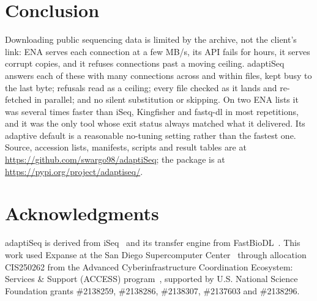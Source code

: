 \documentclass[conference]{IEEEtran}
\begin{document}
\section{Conclusion}
Downloading public sequencing data is limited by the archive, not the client's link: ENA serves each connection at a few MB/s, its API fails for hours, it serves corrupt copies, and it refuses connections past a moving ceiling. adaptiSeq answers each of these with many connections across and within files, kept busy to the last byte; refusals read as a ceiling; every file checked as it lands and re-fetched in parallel; and no silent substitution or skipping. On two ENA lists it was several times faster than iSeq, Kingfisher and fastq-dl in most repetitions, and it was the only tool whose exit status always matched what it delivered. Its adaptive default is a reasonable no-tuning setting rather than the fastest one. Source, accession lists, manifests, scripts and result tables are at \url{https://github.com/swargo98/adaptiSeq}; the package is at \url{https://pypi.org/project/adaptiseq/}.

\section*{Acknowledgments}
adaptiSeq is derived from iSeq~\cite{iseq} and its transfer engine from FastBioDL~\cite{fastbiodl}. This work used Expanse at the San Diego Supercomputer Center~\cite{expanse} through allocation CIS250262 from the Advanced Cyberinfrastructure Coordination Ecosystem: Services \& Support (ACCESS) program~\cite{access}, supported by U.S. National Science Foundation grants \#2138259, \#2138286, \#2138307, \#2137603 and \#2138296.
\end{document}
